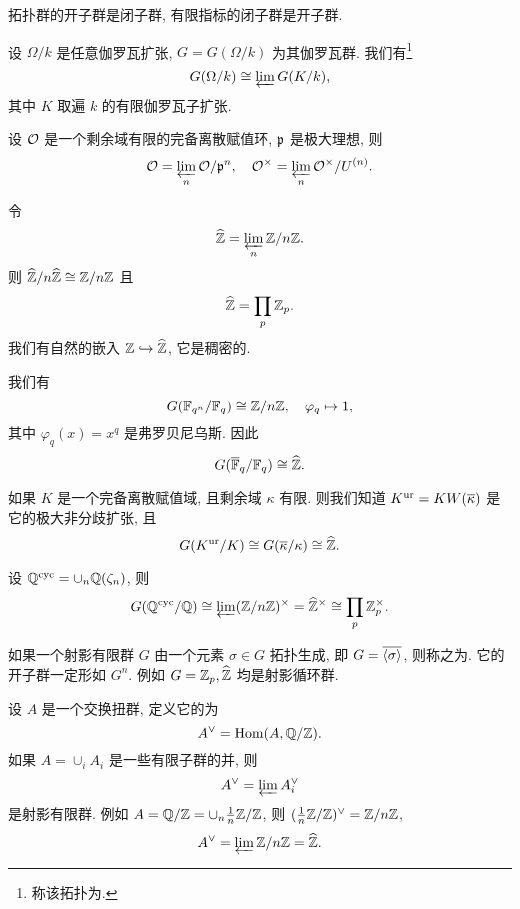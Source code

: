 \begin{exercise}\label{exe:closed_open_subgroups}
拓扑群的开子群是闭子群, 有限指标的闭子群是开子群.
\end{exercise}

\begin{example}
设 $\Omega/k$ 是任意伽罗瓦扩张, $G=G(\Omega/k)$ 为其伽罗瓦群. 我们有\footnote{称该拓扑为.}
  \[G(\Omega/k)\cong\varprojlim\limits G(K/k),\]
其中 $K$ 取遍 $k$ 的有限伽罗瓦子扩张.
\end{example}

\begin{example}
设 ${\mathcal{O}}$ 是一个剩余域有限的完备离散赋值环, ${\mathfrak{p}}$ 是极大理想, 则
  \[{\mathcal{O}}=\varprojlim\limits_n {\mathcal{O}}/{\mathfrak{p}}^n,\quad {\mathcal{O}}^\times=\varprojlim\limits_n {\mathcal{O}}^\times/U^{(n)}.\]
\end{example}

\begin{example}
令
  \[\widehat {{\mathbb{Z}}}=\varprojlim\limits_n {\mathbb{Z}}/n{\mathbb{Z}}.\]
则 $\widehat {{\mathbb{Z}}}/n\widehat {{\mathbb{Z}}}\cong {\mathbb{Z}}/n{\mathbb{Z}}$ 且
  \[\widehat {{\mathbb{Z}}}=\prod_p {\mathbb{Z}}_p.\]
我们有自然的嵌入 ${\mathbb{Z}}\hookrightarrow \widehat {{\mathbb{Z}}}$, 它是稠密的.
\end{example}

\begin{example}
我们有 
  \[G({\mathbb{F}}_{q^n}/{\mathbb{F}}_q)\cong {\mathbb{Z}}/n{\mathbb{Z}},\quad \varphi_q\mapsto 1,\]
其中 $\varphi_q(x)=x^q$ 是弗罗贝尼乌斯. 因此
  \[G(\overline{{\mathbb{F}}}_q/{\mathbb{F}}_q)\cong \widehat {{\mathbb{Z}}}.\]
\end{example}

\begin{example}
如果 $K$ 是一个完备离散赋值域, 且剩余域 $\kappa$ 有限. 则我们知道 $K^{\mathrm{ur}}=K W(\overline\kappa)$ 是它的极大非分歧扩张, 且
  \[G(K^{\mathrm{ur}}/K)\cong G(\overline \kappa/\kappa)\cong \widehat {{\mathbb{Z}}}.\]
\end{example}

\begin{example}
设 ${\mathbb{Q}}^{\mathrm{cyc}}=\cup_n {\mathbb{Q}}(\zeta_n)$, 则
  \[G({\mathbb{Q}}^{\mathrm{cyc}}/{\mathbb{Q}})\cong \varprojlim\limits ({\mathbb{Z}}/n{\mathbb{Z}})^\times=\widehat{{\mathbb{Z}}}^\times\cong\prod_p {\mathbb{Z}}_p^\times.\]
\end{example}

\begin{example}
如果一个射影有限群 $G$ 由一个元素 $\sigma\in G$ 拓扑生成, 即 $G=\overline{\langle{\sigma}\rangle}$, 则称之为. 它的开子群一定形如 $G^n$. 例如 $G={\mathbb{Z}}_p,\widehat {{\mathbb{Z}}}$ 均是射影循环群.
\end{example}

\begin{example}
设 $A$ 是一个交换扭群, 定义它的为
  \[A^\vee={\mathrm{Hom}}(A,{\mathbb{Q}}/{\mathbb{Z}}).\]
如果 $A=\cup_i A_i$ 是一些有限子群的并, 则
  \[A^\vee=\varprojlim\limits A_i^\vee\]
是射影有限群. 例如 $A={\mathbb{Q}}/{\mathbb{Z}}=\cup_n \frac{1}{n}{\mathbb{Z}}/{\mathbb{Z}}$,
则 $(\frac{1}{n}{\mathbb{Z}}/{\mathbb{Z}})^\vee={\mathbb{Z}}/n{\mathbb{Z}}$,
  \[A^\vee=\varprojlim\limits {\mathbb{Z}}/n{\mathbb{Z}}=\widehat {{\mathbb{Z}}}.\]
\end{example}

